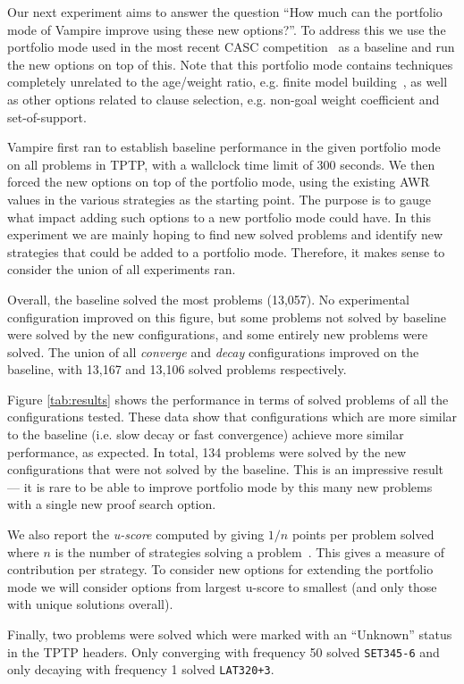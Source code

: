 \documentclass{llncs}
\begin{document}
Our next experiment aims to answer the question ``How much can the portfolio mode of Vampire improve using these new options?''.
To address this we use the portfolio mode used in the most recent CASC competition~\cite{CADE18} as a baseline and run the new options on top of this.
Note that this portfolio mode contains techniques completely unrelated to the age/weight ratio, e.g. finite model building~\cite{fmb}, as well as other options related to clause selection, e.g. non-goal weight coefficient and set-of-support.

Vampire first ran to establish baseline performance in the given portfolio mode on all problems in TPTP, with a wallclock time limit of 300 seconds. We then forced the new options on top of the portfolio mode, using the existing AWR values in the various strategies as the starting point. The purpose is to gauge what impact adding such options to a new portfolio mode could have. In this experiment we are mainly hoping to find new solved problems and identify new strategies that could be added to a portfolio mode. Therefore, it makes sense to consider the union of all experiments ran.

Overall, the baseline solved the most problems (13,057). 
No experimental configuration improved on this figure, but some problems not solved by baseline were solved by the new configurations, and some entirely new problems were solved.
The union of all \emph{converge} and \emph{decay} configurations improved on the baseline, with 13,167 and 13,106 solved problems respectively.

Figure \ref{tab:results} shows the performance in terms of solved problems of all the configurations tested.
These data show that configurations which are more similar to the baseline (i.e. slow decay or fast convergence) achieve more similar performance, as expected.
In total, 134 problems were solved by the new configurations that were not solved by the baseline. This is an impressive result --- it is rare to be able to improve portfolio mode by this many new problems with a single new proof search option.  

We also report the \emph{u-score} computed by giving $1/n$ points per problem solved where $n$ is the number of strategies solving a problem~\cite{u-score}.
This gives a measure of contribution per strategy. To consider new options for extending the portfolio mode we will consider options from largest u-score to smallest (and only those with unique solutions overall).

Finally, two problems were solved which were marked with an ``Unknown'' status in the TPTP headers.
Only converging with frequency 50 solved \texttt{SET345-6} and only decaying with frequency 1 solved \texttt{LAT320+3}.
\end{document}
